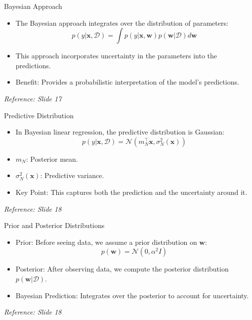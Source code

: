 \documentclass[serif, aspectratio=169]{beamer}
\begin{document}
\begin{frame}{Bayesian Approach}
    \begin{itemize}
        \item The Bayesian approach integrates over the distribution of parameters:
        \[
        p(y | \mathbf{x}, \mathcal{D}) = \int p(y | \mathbf{x}, \mathbf{w}) p(\mathbf{w} | \mathcal{D}) d\mathbf{w}
        \]
        \item This approach incorporates uncertainty in the parameters into the predictions.
        \item Benefit: Provides a probabilistic interpretation of the model’s predictions.
    \end{itemize}
    \textit{Reference: Slide 17}
\end{frame}

\begin{frame}{Predictive Distribution}
    \begin{itemize}
        \item In Bayesian linear regression, the predictive distribution is Gaussian:
        \[
        p(y | \mathbf{x}, \mathcal{D}) = \mathcal{N}(m_N^\top \mathbf{x}, \sigma_N^2(\mathbf{x}))
        \]
        \item \( m_N \): Posterior mean.
        \item \( \sigma_N^2(\mathbf{x}) \): Predictive variance.
        \item Key Point: This captures both the prediction and the uncertainty around it.
    \end{itemize}
    \textit{Reference: Slide 18}
\end{frame}

\begin{frame}{Prior and Posterior Distributions}
    \begin{itemize}
        \item Prior: Before seeing data, we assume a prior distribution on \( \mathbf{w} \):
        \[
        p(\mathbf{w}) = \mathcal{N}(0, \alpha^2 I)
        \]
        \item Posterior: After observing data, we compute the posterior distribution \( p(\mathbf{w} | \mathcal{D}) \).
        \item Bayesian Prediction: Integrates over the posterior to account for uncertainty.
    \end{itemize}
    \textit{Reference: Slide 18}
\end{frame}
\end{document}
